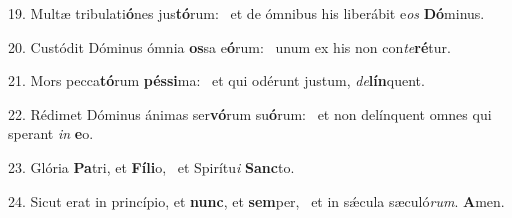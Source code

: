 19. Multæ tribulati\textbf{ó}nes jus\textbf{tó}rum: \ast\  et de ómnibus his liberábit e\textit{os} \textbf{Dó}minus.\

20. Custódit Dóminus ómnia \textbf{os}sa e\textbf{ó}rum: \ast\  unum ex his non con\textit{te}\textbf{ré}tur.\

21. Mors pecca\textbf{tó}rum \textbf{pés}\textbf{si}ma: \ast\  et qui odérunt justum, \textit{de}\textbf{lín}quent.\

22. Rédimet Dóminus ánimas ser\textbf{vó}rum su\textbf{ó}rum: \ast\  et non delínquent omnes qui sperant \textit{in} \textbf{e}o.\

23. Glória \textbf{Pa}tri, et \textbf{Fí}\textbf{li}o, \ast\  et Spirítu\textit{i} \textbf{Sanc}to.\

24. Sicut erat in princípio, et \textbf{nunc}, et \textbf{sem}per, \ast\  et in sǽcula sæculó\textit{rum}. \textbf{A}men.\

